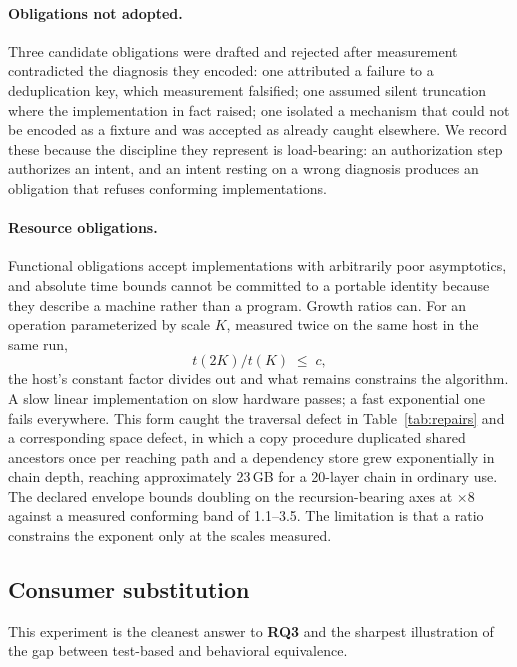 \documentclass[10pt,twocolumn]{article}
\newcommand{\RQ}[1]{\textbf{RQ#1}}
\begin{document}
\paragraph{Obligations not adopted.} Three candidate obligations were
drafted and rejected after measurement contradicted the diagnosis they
encoded: one attributed a failure to a deduplication key, which
measurement falsified; one assumed silent truncation where the
implementation in fact raised; one isolated a mechanism that could not be
encoded as a fixture and was accepted as already caught elsewhere. We
record these because the discipline they represent is load-bearing: an
authorization step authorizes an intent, and an intent resting on a wrong
diagnosis produces an obligation that refuses conforming
implementations.

\paragraph{Resource obligations.} Functional obligations accept
implementations with arbitrarily poor asymptotics, and absolute time
bounds cannot be committed to a portable identity because they describe
a machine rather than a program. Growth ratios can. For an operation
parameterized by scale $K$, measured twice on the same host in the same
run,
\begin{equation}
t(2K)/t(K) \;\le\; c,
\label{eq:ratio}
\end{equation}
the host's constant factor divides out and what remains constrains the
algorithm. A slow linear implementation on slow hardware passes; a fast
exponential one fails everywhere. This form caught the traversal defect
in Table~\ref{tab:repairs} and a corresponding space defect, in which a
copy procedure duplicated shared ancestors once per reaching path and a
dependency store grew exponentially in chain depth, reaching
approximately 23\,GB for a 20-layer chain in ordinary use. The declared
envelope bounds doubling on the recursion-bearing axes at $\times 8$
against a measured conforming band of 1.1--3.5. The limitation is that a
ratio constrains the exponent only at the scales measured.

\subsection{Consumer substitution}
\label{sec:substitution}

This experiment is the cleanest answer to \RQ{3} and the sharpest
illustration of the gap between test-based and behavioral equivalence.
\end{document}
